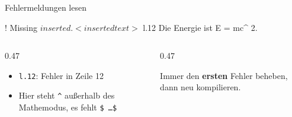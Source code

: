 \begin{frame}[fragile]{Fehlermeldungen lesen}
\begin{code}[listing options={style=log}, colback=akzent!10!papier, colframe=akzent!10!papier]
! Missing $ inserted.
<inserted text>
                $
l.12 Die Energie ist E = mc^
                            2.
\end{code}
  \vspace{0.3em}
  \begin{columns}[T]
    \begin{column}{0.47\textwidth}
      \begin{itemize}
        \item \texttt{l.12}: Fehler in Zeile 12
        \item Hier steht \texttt{\^{}} außerhalb des Mathemodus, es fehlt \texttt{\$\,\dots\$}
      \end{itemize}
    \end{column}
    \begin{column}{0.47\textwidth}
      \begin{merke}
        Immer den \textbf{ersten} Fehler beheben, dann neu kompilieren.
      \end{merke}
    \end{column}
  \end{columns}
\end{frame}
